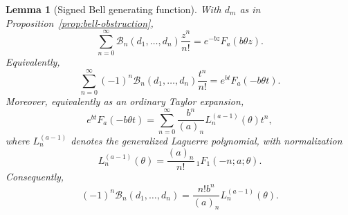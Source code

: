 ﻿\documentclass[preprint,12pt,authoryear]{elsarticle}
\newtheorem{lemma}{Lemma}
\begin{document}
\begin{lemma}[Signed Bell generating function]
\label{lem:bell-generating}
With \(d_m\) as in Proposition~\ref{prop:bell-obstruction},
\begin{equation}
\label{eq:bell-gen-positive}
\sum_{n=0}^{\infty}
\mathcal B_n(d_1,\dots,d_n)\frac{z^n}{n!}
=
e^{-bz}F_a(b\theta z).
\end{equation}
Equivalently,
\begin{equation}
\label{eq:signed-bell-gen}
\sum_{n=0}^{\infty}
(-1)^n\mathcal B_n(d_1,\dots,d_n)\frac{t^n}{n!}
=
e^{bt}F_a(-b\theta t).
\end{equation}
Moreover, equivalently as an ordinary Taylor expansion,
\begin{equation}
\label{eq:laguerre-coeff}
e^{bt}F_a(-b\theta t)
=
\sum_{n=0}^{\infty}
\frac{b^n}{(a)_n}L_n^{(a-1)}(\theta)t^n,
\end{equation}
where \(L_n^{(a-1)}\) denotes the generalized Laguerre polynomial, with normalization
\begin{equation}
L_n^{(a-1)}(\theta)
=
\frac{(a)_n}{n!}\,{}_1F_1(-n;a;\theta).
\end{equation}
Consequently,
\begin{equation}
\label{eq:bell-laguerre-sign}
(-1)^n\mathcal B_n(d_1,\dots,d_n)
=
\frac{n!b^n}{(a)_n}L_n^{(a-1)}(\theta).
\end{equation}
\end{lemma}
\end{document}
